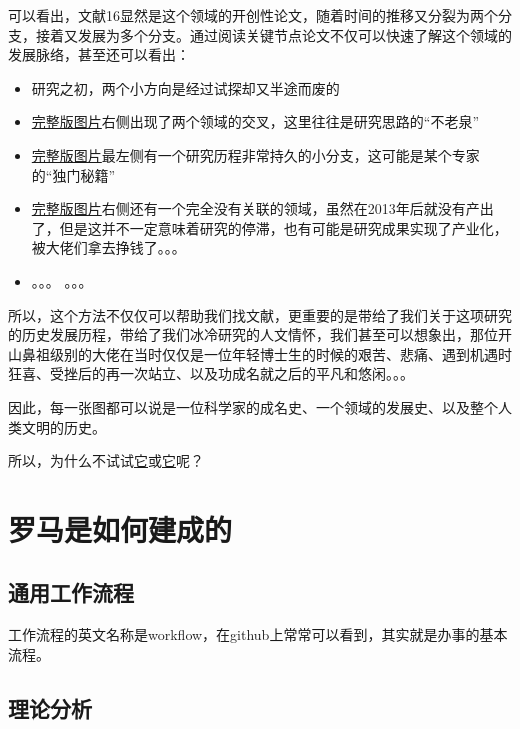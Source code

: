 \documentclass[UTF8]{ctexbook}
\begin{document}
可以看出，文献16显然是这个领域的开创性论文，随着时间的推移又分裂为两个分支，接着又发展为多个分支。通过阅读关键节点论文不仅可以快速了解这个领域的发展脉络，甚至还可以看出：

\begin{itemize}
	\item 研究之初，两个小方向是经过试探却又半途而废的
	\item \href{https://raw.githubusercontent.com/lonelybag/Latex_lonelybag/dev/Script/002_NOTE_of_MASTER/Figure/typical_trace_full.jpg}{完整版图片}右侧出现了两个领域的交叉，这里往往是研究思路的“不老泉”
	\item \href{https://raw.githubusercontent.com/lonelybag/Latex_lonelybag/dev/Script/002_NOTE_of_MASTER/Figure/typical_trace_full.jpg}{完整版图片}最左侧有一个研究历程非常持久的小分支，这可能是某个专家的“独门秘籍”
	\item \href{https://raw.githubusercontent.com/lonelybag/Latex_lonelybag/dev/Script/002_NOTE_of_MASTER/Figure/typical_trace_full.jpg}{完整版图片}右侧还有一个完全没有关联的领域，虽然在2013年后就没有产出了，但是这并不一定意味着研究的停滞，也有可能是研究成果实现了产业化，被大佬们拿去挣钱了。。。
	\item 。。。 。。。
\end{itemize}

所以，这个方法不仅仅可以帮助我们找文献，更重要的是带给了我们关于这项研究的历史发展历程，带给了我们冰冷研究的人文情怀，我们甚至可以想象出，那位开山鼻祖级别的大佬在当时仅仅是一位年轻博士生的时候的艰苦、悲痛、遇到机遇时狂喜、受挫后的再一次站立、以及功成名就之后的平凡和悠闲。。。

因此，每一张图都可以说是一位科学家的成名史、一个领域的发展史、以及整个人类文明的历史。

所以，为什么不试试\href{https://zhuanlan.zhihu.com/p/20902898}{它}或\href{https://zhuanlan.zhihu.com/p/30970993}{它}呢？

\section{罗马是如何建成的}
\subsection{通用工作流程}
工作流程的英文名称是workflow，在github上常常可以看到，其实就是办事的基本流程。
 
\subsection{理论分析}
\end{document}
